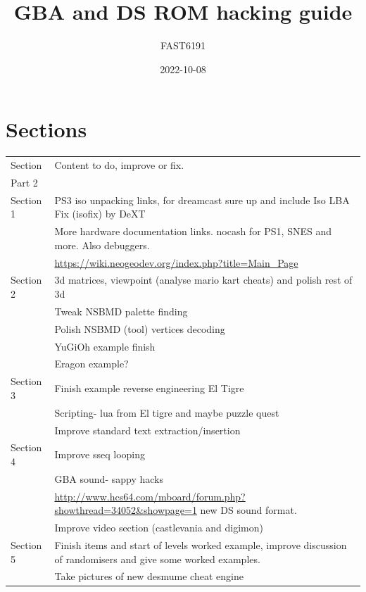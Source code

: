 \documentclass[
]{book}
\title{GBA and DS ROM hacking guide}
\author{FAST6191}
\date{2022-10-08}
\begin{document}
\maketitle

{
\setcounter{tocdepth}{1}
\tableofcontents
}
\hypertarget{sections}{%
\chapter*{Sections}\label{sections}}

\begin{longtable}[]{@{}
  >{\raggedright\arraybackslash}p{}
  >{\raggedright\arraybackslash}p{}@{}}
\toprule()
\endhead
Section & Content to do, improve or fix. \\
Part 2 & \\
Section 1 & PS3 iso unpacking links, for dreamcast sure up and include Iso LBA Fix (isofix) by DeXT \\
& More hardware documentation links. nocash for PS1, SNES and more. Also debuggers. \\
& \url{https://wiki.neogeodev.org/index.php?title=Main_Page} \\
Section 2 & 3d matrices, viewpoint (analyse mario kart cheats) and polish rest of 3d \\
& Tweak NSBMD palette finding \\
& Polish NSBMD (tool) vertices decoding \\
& YuGiOh example finish \\
& Eragon example? \\
Section 3 & Finish example reverse engineering El Tigre \\
& Scripting- lua from El tigre and maybe puzzle quest \\
& Improve standard text extraction/insertion \\
Section 4 & Improve sseq looping \\
& GBA sound- sappy hacks \\
& \url{http://www.hcs64.com/mboard/forum.php?showthread=34052\&showpage=1} new DS sound format. \\
& Improve video section (castlevania and digimon) \\
Section 5 & Finish items and start of levels worked example, improve discussion of randomisers and give some worked examples. \\
& Take pictures of new desmume cheat engine \\

\end{longtable}
\end{document}
